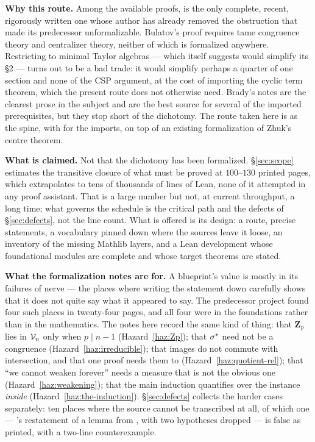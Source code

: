 \documentclass[11pt]{article}
\begin{document}
\medskip

\noindent\textbf{Why this route.} Among the available proofs,
\cite{ZhukSimplified} is the only complete, recent, rigorously written one whose
author has already removed the obstruction that made its predecessor
unformalizable. Bulatov's proof requires tame congruence theory and centralizer
theory, neither of which is formalized anywhere. Restricting to minimal Taylor
algebras --- which \cite{ZhukSimplified} itself suggests would simplify its
\S2 --- turns out to be a bad trade: it would simplify perhaps a quarter of one
section and none of the CSP argument, at the cost of importing the cyclic term
theorem, which the present route does not otherwise need. Brady's notes
\cite{BradyNotes} are the clearest prose in the subject and are the best source
for several of the imported prerequisites, but they stop short of the
dichotomy. The route taken here is \cite{ZhukSimplified} as the spine, with
\cite{BradyNotes} for the imports, on top of an existing formalization of Zhuk's
centre theorem.

\medskip

\noindent\textbf{What is claimed.} Not that the dichotomy has been formalized.
\S\ref{sec:scope} estimates the transitive closure of what must be proved at
$100$--$130$ printed pages, which extrapolates to tens of thousands of lines of
Lean, none of it attempted in any proof assistant. That is a large number but
not, at current throughput, a long time; what governs the schedule is the
critical path and the defects of \S\ref{sec:defects}, not the line count. What is offered is its design: a route, precise statements, a
vocabulary pinned down where the sources leave it loose, an inventory of the
missing Mathlib layers, and a Lean development whose foundational modules are
complete and whose target theorems are stated.

\medskip

\noindent\textbf{What the formalization notes are for.} A blueprint's value is
mostly in its failures of nerve --- the places where writing the statement down
carefully shows that it does not quite say what it appeared to say. The
predecessor project found four such places in twenty-four pages, and all four
were in the foundations rather than in the mathematics. The notes here record
the same kind of thing: that $\mathbf Z_{p}$ lies in $\mathcal V_{n}$ only when
$p\mid n-1$ (Hazard~\ref{haz:Zp}); that $\sigma^{*}$ need not be a congruence
(Hazard~\ref{haz:irreducible}); that images do not commute with intersection,
and that one proof needs them to (Hazard~\ref{haz:quotient-rel}); that ``we
cannot weaken forever'' needs a measure that is not the obvious one
(Hazard~\ref{haz:weakening}); that the main induction quantifies over the
instance \emph{inside} (Hazard~\ref{haz:the-induction}). \S\ref{sec:defects} collects the
harder cases separately: ten places where the source cannot be transcribed at
all, of which one --- \cite{ZhukSimplified}'s restatement of a lemma from
\cite{ZhukStrong}, with two hypotheses dropped --- is false as printed, with a
two-line counterexample.
\end{document}
